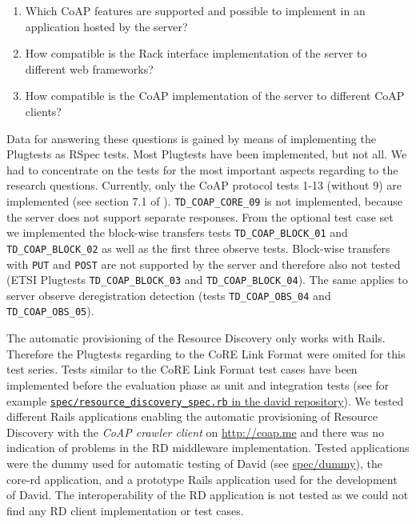 		\begin{enumerate}
			\item Which \ac{CoAP} features are supported and possible to
				implement in an application hosted by the server?
			\item How compatible is the Rack interface implementation of
				the server to different web frameworks? 
			\item How compatible is the \ac{CoAP} implementation of the
				server to different \ac{CoAP} clients?
		\end{enumerate}

		Data for answering these questions is gained by means of
		implementing the Plugtests as RSpec tests. Most Plugtests have been
		implemented, but not all. We had to concentrate on the tests for the
		most important aspects regarding to the research questions. Currently,
		only the \ac{CoAP} protocol tests 1-13 (without 9) are implemented (see
		section 7.1 of \cite{etsi-plugtests}). \texttt{TD\_COAP\_CORE\_09} is
		not implemented, because the server does not support separate
		responses. From the optional test case set we implemented the
		block-wise transfers tests \texttt{TD\_COAP\_BLOCK\_01} and
		\texttt{TD\_COAP\_BLOCK\_02} as well as the first three observe tests.
		Block-wise transfers with \texttt{PUT} and \texttt{POST} are not
		supported by the server and therefore also not tested (\ac{ETSI}
		Plugtests \texttt{TD\_COAP\_BLOCK\_03} and
		\texttt{TD\_COAP\_BLOCK\_04}). The same applies to server observe
		deregistration detection (tests \texttt{TD\_COAP\_OBS\_04} and
		\texttt{TD\_COAP\_OBS\_05}).

		The automatic provisioning of the Resource Discovery only works with
		\ac{Rails}. Therefore the Plugtests regarding to the \ac{CoRE} Link
		Format were omited for this test series. Tests similar to the \ac{CoRE}
		Link Format test cases have been implemented before the evaluation
		phase as unit and integration tests (see for example
		\href{https://github.com/nning/david/blob/0.4.3/spec/resource\_discovery\_spec.rb}{\texttt{spec/resource\_discovery\_spec.rb}
		in the david repository}). We tested different \ac{Rails} applications
		enabling the automatic provisioning of Resource Discovery with the
		\emph{\ac{CoAP} crawler client} on \url{http://coap.me} and there was
		no indication of problems in the \ac{RD} middleware implementation.
		Tested applications were the dummy used for automatic testing of David
		(see
		\href{https://github.com/nning/david/tree/0.4.3/spec/dummy}{spec/dummy}),
		the core-rd application, and a prototype \ac{Rails} application used
		for the development of David. The interoperability of the \ac{RD}
		application is not tested as we could not find any \ac{RD} client
		implementation or test cases.
		
